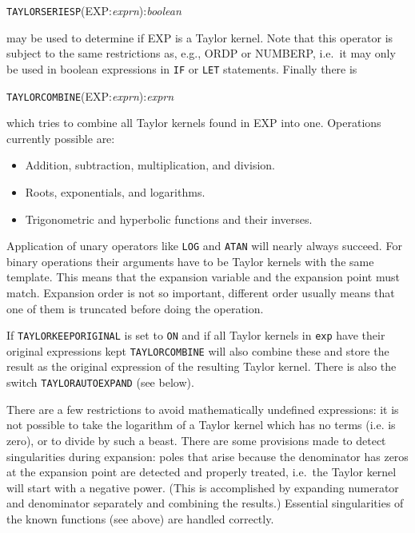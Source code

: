 \hspace*{2em} {\tt TAYLORSERIESP}(EXP:{\em exprn}):{\em boolean}

may be used to determine if EXP is a Taylor kernel.
 Note that this operator is subject to the same
restrictions as, e.g., ORDP or NUMBERP, i.e.\ it may only be used in
boolean expressions in \verb|IF| or \verb|LET| statements.  Finally
there is

\hspace*{2em} {\tt TAYLORCOMBINE}(EXP:{\em exprn}):{\em exprn}

which tries to combine all Taylor kernels found in EXP into one.
Operations currently possible are:
\begin{itemize}
  \item Addition, subtraction, multiplication, and division.
  \item Roots, exponentials, and logarithms.
  \item Trigonometric and hyperbolic functions and their inverses.
\end{itemize}
Application of unary operators like \verb|LOG| and \verb|ATAN| will
nearly always succeed. For binary operations their arguments have to be
Taylor kernels with the same template. This means that the expansion
variable and the expansion point must match. Expansion order is not so
important, different order usually means that one of them is truncated
before doing the operation.

 
If \verb|TAYLORKEEPORIGINAL| is set to \verb|ON| and if all Taylor
kernels in \verb|exp| have their original expressions kept
\verb|TAYLORCOMBINE| will also combine these and store the result
as the original expression of the resulting Taylor kernel.
There is also the switch \verb|TAYLORAUTOEXPAND| (see below).

There are a few restrictions to avoid mathematically undefined
expressions: it is not possible to take the logarithm of a Taylor
kernel which has no terms (i.e. is zero), or to divide by such a
beast.  There are some provisions made to detect singularities during
expansion: poles that arise because the denominator has zeros at the
expansion point are detected and properly treated, i.e.\ the Taylor
kernel will start with a negative power.  (This is accomplished by
expanding numerator and denominator separately and combining the
results.)  Essential singularities of the known functions (see above)
are handled correctly.

